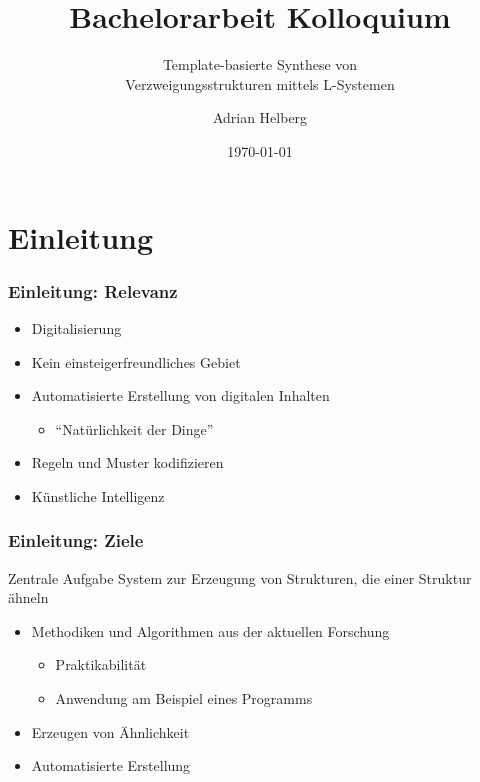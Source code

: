 \documentclass[12pt]{beamer}
\subtitle{Template-basierte Synthese von\\Verzweigungsstrukturen mittels L-Systemen}
\title{Bachelorarbeit Kolloquium}
\author{Adrian Helberg}
\institute{HAW Hamburg}
\date{\today}
\begin{document}
    \frame{\titlepage}

    \section{Einleitung}
    \label{sec:thema}
    \begin{frame}
        \frametitle{Einleitung: Relevanz}

        \begin{itemize}
            \setlength\itemsep{1em}
            \item<1-> Digitalisierung
            \item<2-> Kein einsteigerfreundliches Gebiet
            \item<3-> Automatisierte Erstellung von digitalen Inhalten
            \begin{itemize}
                \item "`Natürlichkeit der Dinge"'
            \end{itemize}
            \item<4-> Regeln und Muster kodifizieren
            \item<5-> Künstliche Intelligenz
        \end{itemize}
    \end{frame}

    \begin{frame}
        \frametitle{Einleitung: Ziele}

        \begin{block}{Zentrale Aufgabe}
            System zur Erzeugung von Strukturen, die einer Struktur ähneln
        \end{block}

        \begin{itemize}
            \setlength\itemsep{1.4em}
            \item<2-> Methodiken und Algorithmen aus der aktuellen Forschung
            \begin{itemize}
                \item Praktikabilität
                \item Anwendung am Beispiel eines Programms
            \end{itemize}
            \item<3-> Erzeugen von Ähnlichkeit
            \item<4-> Automatisierte Erstellung
        \end{itemize}
    \end{frame}
\end{document}
